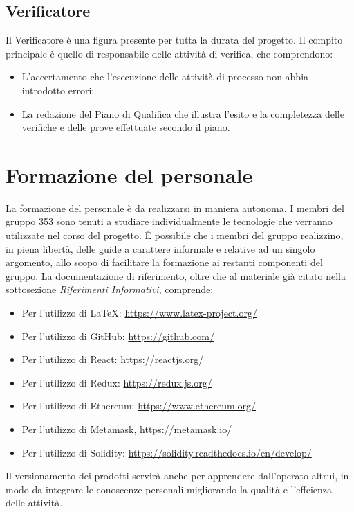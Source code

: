 \documentclass[NormeDiProgetto.tex]{subfiles}
\begin{document}
	\subsection{Verificatore}
	Il Verificatore è una figura presente per tutta la durata del progetto. Il compito principale è quello di responsabile delle attività di verifica, che comprendono:
	\begin{itemize}
	\item L'accertamento che l'esecuzione delle attività di processo non abbia introdotto errori;
	\item La redazione del Piano di Qualifica che illustra l'esito e la completezza delle verifiche e delle prove effettuate secondo il piano.
	\end{itemize}
	\section{Formazione del personale}
	La formazione del personale è da realizzarsi in maniera autonoma. I membri del gruppo 353 sono tenuti a studiare individualmente le tecnologie che verranno utilizzate nel corso del progetto. \'{E} possibile che i membri del gruppo realizzino, in piena libertà, delle guide a carattere informale e relative ad un singolo argomento, allo scopo di facilitare la formazione ai restanti componenti del gruppo. La documentazione di riferimento, oltre che al materiale già citato nella sottosezione \emph{Riferimenti Informativi}, comprende:\\
	\begin{itemize}
		\item Per l'utilizzo di \LaTeX: \url{https://www.latex-project.org/} \\
		\item Per l'utilizzo di GitHub: \url{https://github.com/}\\
		\item Per l'utilizzo di React: \url{https://reactjs.org/}\\
		\item Per l'utilizzo di Redux: \url{https://redux.js.org/}\\
		\item Per l'utilizzo di Ethereum: \url{https://www.ethereum.org/}\\
		\item Per l'utilizzo di Metamask, \url{https://metamask.io/}\\ 
		\item Per l'utilizzo di Solidity: \url{https://solidity.readthedocs.io/en/develop/}\\
	\end{itemize}
	Il versionamento dei prodotti servirà anche per apprendere dall'operato
	altrui, in modo da integrare le conoscenze personali migliorando la qualità e
	l'effcienza delle attività.
\end{document}
